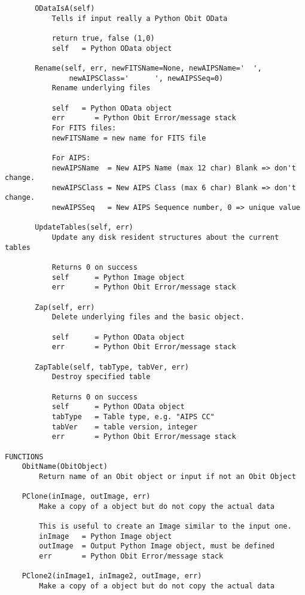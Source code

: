 \documentclass[11pt]{report}
\begin{document}
\begin{verbatim}
       ODataIsA(self)
           Tells if input really a Python Obit OData
           
           return true, false (1,0)
           self   = Python OData object
       
       Rename(self, err, newFITSName=None, newAIPSName='  ',
               newAIPSClass='      ', newAIPSSeq=0)
           Rename underlying files
           
           self   = Python OData object
           err       = Python Obit Error/message stack
           For FITS files:
           newFITSName = new name for FITS file
           
           For AIPS:
           newAIPSName  = New AIPS Name (max 12 char) Blank => don't change.
           newAIPSClass = New AIPS Class (max 6 char) Blank => don't change.
           newAIPSSeq   = New AIPS Sequence number, 0 => unique value
       
       UpdateTables(self, err)
           Update any disk resident structures about the current tables
           
           Returns 0 on success
           self      = Python Image object
           err       = Python Obit Error/message stack
       
       Zap(self, err)
           Delete underlying files and the basic object.
           
           self      = Python OData object
           err       = Python Obit Error/message stack
       
       ZapTable(self, tabType, tabVer, err)
           Destroy specified table
           
           Returns 0 on success
           self      = Python OData object
           tabType   = Table type, e.g. "AIPS CC"
           tabVer    = table version, integer
           err       = Python Obit Error/message stack

FUNCTIONS
    ObitName(ObitObject)
        Return name of an Obit object or input if not an Obit Object
    
    PClone(inImage, outImage, err)
        Make a copy of a object but do not copy the actual data
        
        This is useful to create an Image similar to the input one.
        inImage   = Python Image object
        outImage  = Output Python Image object, must be defined
        err       = Python Obit Error/message stack
    
    PClone2(inImage1, inImage2, outImage, err)
        Make a copy of a object but do not copy the actual data
        

\end{verbatim}
\end{document}
